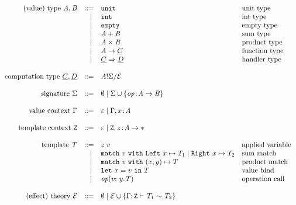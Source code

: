 
\[
	\begin{array}{rrll}
		\text{(value) type}~\tyA, \tyB
		 & ::=   & \unittype          				& \text{unit type}			\\
		 & \vsep & \inttype         					& \text{int type}				\\
		 & \vsep & \emptytype         				& \text{empty type}			\\
		 & \vsep & \sumtype{\tyA}{\tyB}   		& \text{sum type}				\\
		 & \vsep & \producttype{\tyA}{\tyB}   & \text{product type}		\\
		 & \vsep & \tyA \to \ctyC     				& \text{function type}	\\
		 & \vsep & \ctyC \hto \ctyD   				& \text{handler type}		\\
		\\
		\text{computation type}~\ctyC, \ctyD
		 & ::=   & \ctype{\tyA}{\sig}{\eqE} \\
		\\
		\text{signature}~\sig
		 & ::=   & \nil \vsep \sig \union \set{{\op \oftype \tyA \to \tyB}} \\
		\\
		\text{value context}~\ctx
		 & ::=   & \varepsilon \vsep \ctx, x \oftype \tyA \\
		\\
		\text{template context}~\tvars
		 & ::=   & \varepsilon \vsep \tvars, z \oftype \tyA \to \anytype \\
		\\
		\text{template}~\tmplT
		 & ::=   & \apply{z}{v} & \text{applied variable} 											\\
		 & \vsep & \match{v} 	\inleft{x} \mapsto T_1 
		 	 \vsep	 \inright{x} \mapsto T_2  & \text{sum match}		 							\\
		 & \vsep & \match{v} \pair{x}{y} \mapsto T & \text{product match} 			\\
		 & \vsep & \letbind{x}{v} T & \text{value bind} 												\\
		 & \vsep & \operation{v}{y.\tmplT} & \text{operation call} 							\\
		\\
		\text{(effect) theory}~\eqE
		 & ::=   & \nil \vsep \eqE \union
							 \set{\teqjudgement{\tenv}{\tmplT_1 \rel \tmplT_2}} \\
	\end{array}
\]

